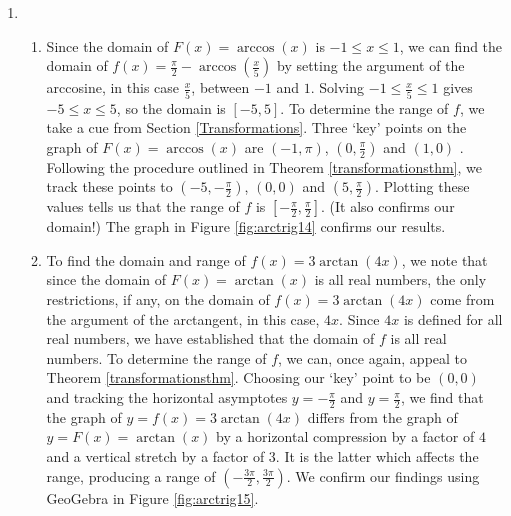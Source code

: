 {\begin{enumerate}
\begin{enumerate}

\end{enumerate}


\item \begin{enumerate}

\item  Since the domain of $F(x) = \arccos(x)$ is $-1 \leq x \leq 1$, we can find the domain of $f(x) = \frac{\pi}{2} - \arccos\left(\frac{x}{5}\right)$ by setting the argument of the arccosine, in this case $\frac{x}{5}$, between $-1$ and $1$. Solving  $-1 \leq \frac{x}{5} \leq 1$ gives $-5 \leq x \leq 5$, so the domain is $[-5,5]$.  To determine the range of $f$, we take a cue from Section \ref{Transformations}. Three `key' points on the graph of $F(x) = \arccos(x)$ are  $(-1, \pi)$, $\left(0, \frac{\pi}{2}\right)$ and $(1,0)$ . Following the procedure outlined in Theorem \ref{transformationsthm}, we track these points to $\left(-5, -\frac{\pi}{2}\right)$, $(0, 0)$ and $\left(5, \frac{\pi}{2}\right)$. Plotting these values tells us that the range of $f$ is $\left[-\frac{\pi}{2}, \frac{\pi}{2}\right]$. (It also confirms our domain!) The graph in Figure \ref{fig:arctrig14} confirms our results.


\item  To find the domain and range of $f(x) = 3\arctan\left(4x \right)$, we note that since the domain of $F(x) = \arctan(x)$ is all real numbers, the only restrictions, if any, on the domain of  $f(x) = 3\arctan\left(4x \right)$ come from the argument of the arctangent, in this case, $4x$.  Since $4x$ is defined for all real numbers, we have established that the domain of $f$ is all real numbers.  To determine the range of $f$, we can, once again, appeal to Theorem \ref{transformationsthm}.  Choosing our `key' point to be $(0,0)$ and tracking the horizontal asymptotes $y = -\frac{\pi}{2}$ and $y= \frac{\pi}{2}$, we find that the graph of $y = f(x) = 3\arctan\left(4x \right)$ differs from the graph of $y = F(x) = \arctan(x)$ by a horizontal compression by a factor of $4$ and a vertical stretch by a factor of $3$.  It is the latter which affects the range, producing a range of $\left(-\frac{3\pi}{2}, \frac{3\pi}{2} \right)$.  We confirm our findings using GeoGebra in Figure \ref{fig:arctrig15}.


\end{enumerate}
\end{enumerate}}
